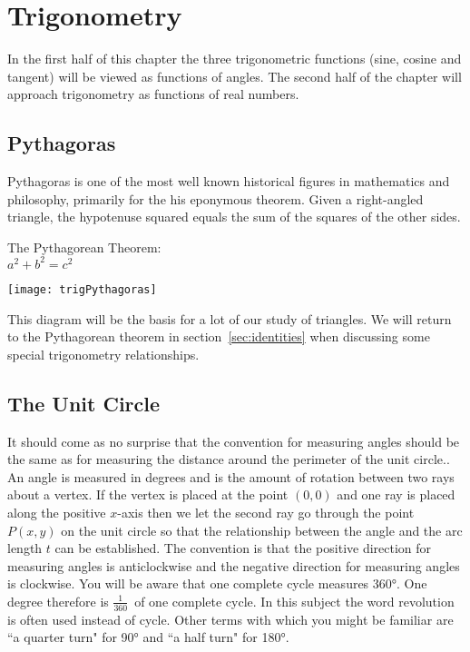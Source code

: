 \chapter{Trigonometry}

In the first half of this chapter the three trigonometric functions (sine, cosine and tangent) will be viewed as functions of angles. The second half of the chapter will approach trigonometry as functions of real numbers.
\section*{Pythagoras}
Pythagoras is one of the most well known historical figures in mathematics and philosophy, primarily for the his eponymous theorem. Given a right-angled triangle, the hypotenuse squared equals the sum of the squares of the other sides.
\begin{tcolorbox}[colback=white]
	\begin{multicols}{2}
		\begin{center}
			The Pythagorean Theorem:\\
			
			\vspace{1cm}$a^2+b^2=c^2$
		\end{center}
\columnbreak
\begin{center}
	\texttt{[image: trigPythagoras]}
\end{center}
	\end{multicols}
\end{tcolorbox}
This diagram will be the basis for a lot of our study of triangles. We will return to the Pythagorean theorem in section~\ref{sec:identities} when discussing some special trigonometry relationships.
\section{The Unit Circle}
It should come as no surprise that the convention for measuring angles should be the same as for measuring
the distance around the perimeter of the unit circle.. An angle is measured in degrees and is the amount of
rotation between two rays about a vertex. If the vertex is placed at the point $\left (0 ,0\right )$ and one ray is placed along the positive $x$-axis then we let the second ray go through the point $P (x ,y)$ on the unit circle so that the relationship between the angle and the arc length $t$ can be established. The convention is that the positive direction for measuring
angles is anticlockwise and the negative direction for measuring angles is clockwise. You will be aware that one complete cycle measures \ang{360}. One degree therefore is $\frac{1}{360}$\ of one complete cycle. In this subject the word revolution is often used instead of cycle. Other terms with which you might be familiar are ``a quarter turn" for \ang{90} and ``a half turn" for \ang{180}. 

